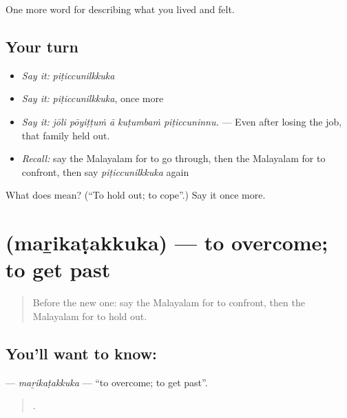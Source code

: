 \begin{grammarlens}[title={What you've built}]
One more word for describing what you lived and felt.
\end{grammarlens}

\subsection*{Your turn}
\begin{itemize}
\raggedright
  \item \emph{Say it:} \emph{piṭiccunilkkuka}
  \item \emph{Say it:} \emph{piṭiccunilkkuka}, once more
  \item \emph{Say it:} \emph{jōli pōyiṭṭuṁ ā kuṭumbaṁ piṭiccuninnu.} — Even after losing the job, that family held out.
  \item \emph{Recall:} say the Malayalam for to go through, then the Malayalam for to confront, then say \emph{piṭiccunilkkuka} again
\end{itemize}

\begin{tcolorbox}[breakable,colback=teal!4,colframe=teal!35!black,title={Before you move on}]
What does  mean? (\textquotedblleft{}To hold out; to cope\textquotedblright{}.) Say it once more.
\end{tcolorbox}
\section[\texorpdfstring{\ml{മറികടക്കുക} (maṟikaṭakkuka)}{മറികടക്കുക (maṟikaṭakkuka)}]{ (maṟikaṭakkuka) — to overcome; to get past}

\label{lesson:ML-C567-marikatakkuka}



\begin{quote}
Before the new one: say the Malayalam for to confront, then the Malayalam for to hold out.
\end{quote}

\subsection*{You'll want to know: }
\textbf{} — \emph{maṟikaṭakkuka} — \textquotedblleft{}to overcome; to get past\textquotedblright{}.

\begin{quote}
    .
\end{quote}


